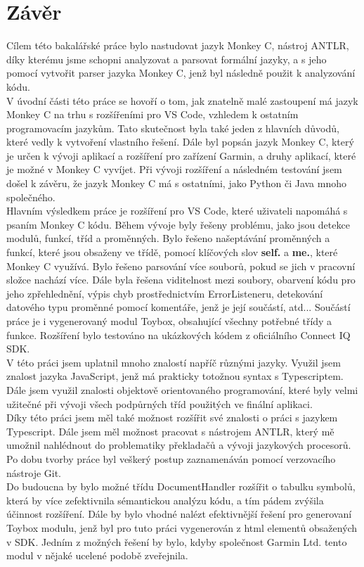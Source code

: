 \chapter{Závěr}
Cílem této bakalářské práce bylo nastudovat jazyk Monkey C, nástroj ANTLR, díky kterému jsme schopni analyzovat a parsovat formální jazyky, a s jeho pomocí vytvořit parser jazyka Monkey C, jenž byl následně použit k analyzování kódu. 
\\
V úvodní části této práce se hovoří o tom, jak znatelně malé zastoupení má jazyk Monkey C na trhu s rozšířeními pro VS Code, vzhledem k ostatním programovacím jazykům. Tato skutečnost byla také jeden z hlavních důvodů, které vedly k vytvoření vlastního řešení. Dále byl popsán jazyk Monkey C, který je určen k vývoji aplikací a rozšíření pro zařízení Garmin, a druhy aplikací, které je možné v Monkey C vyvíjet. Při vývoji rozšíření a následném testování jsem došel k závěru, že jazyk Monkey C má s ostatními, jako Python či Java mnoho společného. 
\\
Hlavním výsledkem práce je rozšíření pro VS Code, které uživateli napomáhá s psaním Monkey C kódu. Během vývoje byly řešeny problému, jako jsou detekce modulů, funkcí, tříd a proměnných. Bylo řešeno našeptávání proměnných a funkcí, které jsou obsaženy ve třídě, pomocí klíčových slov \textbf{self.} a \textbf{me.}, které Monkey C využívá. Bylo řešeno parsování více souborů, pokud se jich v pracovní složce nachází více. Dále byla řešena viditelnost mezi soubory, obarvení kódu pro jeho zpřehlednění, výpis chyb prostřednictvím ErrorListeneru, detekování datového typu proměnné pomocí komentáře, jenž je její součástí, atd... Součástí práce je i vygenerovaný modul Toybox, obsahující všechny potřebné třídy a funkce. Rozšíření bylo testováno na ukázkových kódem z oficiálního Connect IQ SDK.
\\
V této práci jsem uplatnil mnoho znalostí napříč různými jazyky. Využil jsem znalost jazyka JavaScript, jenž má prakticky totožnou syntax s Typescriptem. Dále jsem využil znalosti objektově orientovaného programování, které byly velmi užitečné při vývoji všech podpůrných tříd použitých ve finální aplikaci.\\
Díky této práci jsem měl také možnost rozšířit své znalosti o práci s jazykem Typescript. Dále jsem měl možnost pracovat s nástrojem ANTLR, který mě umožnil nahlédnout do problematiky překladačů a vývoji jazykových procesorů. Po dobu tvorby práce byl veškerý postup zaznamenáván pomocí verzovacího nástroje Git.
\\
Do budoucna by bylo možné třídu DocumentHandler rozšířit o tabulku symbolů, která by více zefektivnila sémantickou analýzu kódu, a tím pádem zvýšila účinnost rozšíření. Dále by bylo vhodné nalézt efektivnější řešení pro generovaní Toybox modulu, jenž byl pro tuto práci vygenerován z html elementů obsažených v SDK. Jedním z možných řešení by bylo, kdyby společnost Garmin Ltd. \cite{GARMIN_OFFICIAL} tento modul v nějaké ucelené podobě zveřejnila.

\endinput